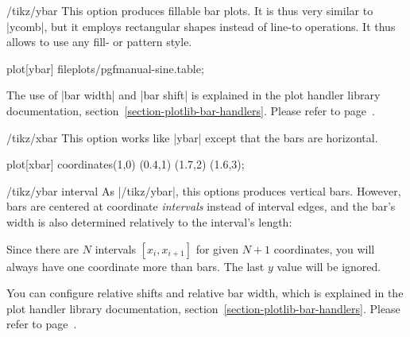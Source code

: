 \begin{key}{/tikz/ybar}
  This option produces fillable bar plots. It is thus very similar to |ycomb|, but it employs rectangular shapes instead of line-to operations. It thus allows to use any fill- or pattern style.

\begin{codeexample}[]
\tikz\draw[draw=blue,fill=blue!60!black] plot[ybar] file{plots/pgfmanual-sine.table};
\end{codeexample}

\begin{codeexample}[]
\end{codeexample}
	The use of |bar width| and |bar shift| is explained in the plot handler library documentation, section~\ref{section-plotlib-bar-handlers}. Please refer to page~\pageref{key-bar-width}.
\end{key}

\begin{key}{/tikz/xbar}
  This option works like |ybar| except that the bars are horizontal. 

\begin{codeexample}[]
\tikz \draw[pattern=north west lines] plot[xbar] 
   coordinates{(1,0) (0.4,1) (1.7,2) (1.6,3)};
\end{codeexample}
\end{key}

\begin{key}{/tikz/ybar interval}
  As |/tikz/ybar|, this options produces vertical bars. However, bars are centered at coordinate \emph{intervals} instead of interval edges, and the bar's width is also determined relatively to the interval's length:

\begin{codeexample}[]
\end{codeexample}
	Since there are $N$ intervals $[x_i,x_{i+1}]$ for given $N+1$ coordinates, you will always have one coordinate more than bars. The last $y$ value will be ignored.

	You can configure relative shifts and relative bar width, which is explained in the plot handler library documentation, section~\ref{section-plotlib-bar-handlers}. Please refer to page~\pageref{key-bar-interval-width}.
\end{key}

